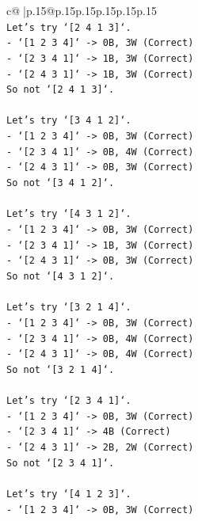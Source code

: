 \documentclass{article}
\begin{document}
{\begin{supertabular}{c@{$\;$}|p{.15\linewidth}@{}p{.15\linewidth}p{.15\linewidth}p{.15\linewidth}p{.15\linewidth}p{.15\linewidth}}
{{{\\ 
\texttt{Let's try `{[}2 4 1 3{]}`.} \\
\texttt{{-} `{[}1 2 3 4{]}` {-}> 0B, 3W (Correct)} \\
\texttt{{-} `{[}2 3 4 1{]}` {-}> 1B, 3W (Correct)} \\
\texttt{{-} `{[}2 4 3 1{]}` {-}> 1B, 3W (Correct)} \\
\texttt{So not `{[}2 4 1 3{]}`.} \\
\\ 
\texttt{Let's try `{[}3 4 1 2{]}`.} \\
\texttt{{-} `{[}1 2 3 4{]}` {-}> 0B, 3W (Correct)} \\
\texttt{{-} `{[}2 3 4 1{]}` {-}> 0B, 4W (Correct)} \\
\texttt{{-} `{[}2 4 3 1{]}` {-}> 0B, 3W (Correct)} \\
\texttt{So not `{[}3 4 1 2{]}`.} \\
\\ 
\texttt{Let's try `{[}4 3 1 2{]}`.} \\
\texttt{{-} `{[}1 2 3 4{]}` {-}> 0B, 3W (Correct)} \\
\texttt{{-} `{[}2 3 4 1{]}` {-}> 1B, 3W (Correct)} \\
\texttt{{-} `{[}2 4 3 1{]}` {-}> 0B, 3W (Correct)} \\
\texttt{So not `{[}4 3 1 2{]}`.} \\
\\ 
\texttt{Let's try `{[}3 2 1 4{]}`.} \\
\texttt{{-} `{[}1 2 3 4{]}` {-}> 0B, 3W (Correct)} \\
\texttt{{-} `{[}2 3 4 1{]}` {-}> 0B, 4W (Correct)} \\
\texttt{{-} `{[}2 4 3 1{]}` {-}> 0B, 4W (Correct)} \\
\texttt{So not `{[}3 2 1 4{]}`.} \\
\\ 
\texttt{Let's try `{[}2 3 4 1{]}`.} \\
\texttt{{-} `{[}1 2 3 4{]}` {-}> 0B, 3W (Correct)} \\
\texttt{{-} `{[}2 3 4 1{]}` {-}> 4B (Correct)} \\
\texttt{{-} `{[}2 4 3 1{]}` {-}> 2B, 2W (Correct)} \\
\texttt{So not `{[}2 3 4 1{]}`.} \\
\\ 
\texttt{Let's try `{[}4 1 2 3{]}`.} \\
\texttt{{-} `{[}1 2 3 4{]}` {-}> 0B, 3W (Correct)} \\
}}}
\end{supertabular}}
\end{document}
